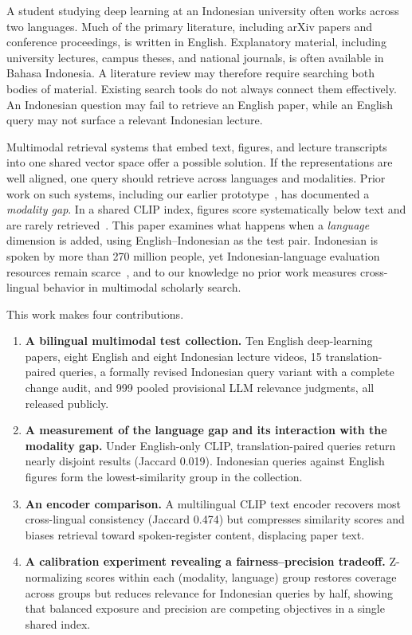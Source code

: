 \documentclass[conference]{IEEEtran}
\begin{document}
A student studying deep learning at an Indonesian university often works
across two languages. Much of the primary literature, including arXiv papers
and conference proceedings, is written in English. Explanatory material,
including university lectures, campus theses, and national journals, is
often available in Bahasa Indonesia. A literature review may therefore
require searching both bodies of material. Existing search tools do not
always connect them effectively. An Indonesian question may fail to retrieve
an English paper, while an English query may not surface a relevant
Indonesian lecture.

Multimodal retrieval systems that embed text, figures, and lecture
transcripts into one shared vector space offer a possible solution. If the
representations are well aligned, one query should retrieve across languages
and modalities. Prior work on such systems, including our earlier
prototype~\cite{synthesizer}, has documented a \emph{modality gap}. In a
shared CLIP index, figures score systematically below text and are rarely
retrieved~\cite{liang2022mind}. This paper examines what happens when a
\emph{language} dimension is added, using English--Indonesian as the test
pair. Indonesian is spoken by more than 270 million people, yet
Indonesian-language evaluation resources remain scarce~\cite{nusacrowd,
indonlu}, and to our knowledge no prior work measures cross-lingual behavior
in multimodal scholarly search.

This work makes four contributions.
\begin{enumerate}
  \item \textbf{A bilingual multimodal test collection.} Ten English
  deep-learning papers, eight English and eight Indonesian lecture videos,
  15 translation-paired queries, a formally revised Indonesian query variant with a complete
  change audit, and 999 pooled provisional LLM relevance judgments, all
  released publicly.
  \item \textbf{A measurement of the language gap and its interaction with
  the modality gap.} Under English-only CLIP, translation-paired queries
  return nearly disjoint results (Jaccard 0.019). Indonesian queries against
  English figures form the lowest-similarity
  group in the collection.
  \item \textbf{An encoder comparison.} A multilingual CLIP text encoder
  recovers most cross-lingual consistency (Jaccard 0.474) but compresses
  similarity scores and biases retrieval toward spoken-register content,
  displacing paper text.
  \item \textbf{A calibration experiment revealing a fairness--precision
  tradeoff.} Z-normalizing scores within each (modality, language) group
  restores coverage across groups but reduces relevance for Indonesian
  queries by half, showing that balanced exposure and precision are
  competing objectives in a single shared index.
\end{enumerate}
\end{document}
